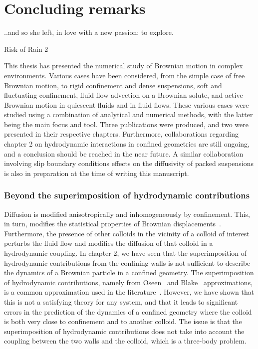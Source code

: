 \chapter{Concluding remarks}


\epigraph{..and so she left, in love with a new passion: to explore.}{Risk of Rain 2}
This thesis has presented the numerical study of Brownian motion in complex environments. Various cases have been considered, from the simple case of free Brownian motion, to rigid confinement and dense suspensions, soft and fluctuating confinement, fluid flow advection on a Brownian solute, and active Brownian motion in quiescent fluids and in fluid flows. 
These various cases were studied using a combination of analytical and numerical methods, with the latter being the main focus and tool. Three publications were produced, and two were presented in their respective chapters. Furthermore, collaborations regarding chapter 2 on hydrodynamic interactions in confined geometries are still ongoing, and a conclusion should be reached in the near future. A similar collaboration involving slip boundary conditions effects on the diffusivity of packed suspensions is also in preparation at the time of writing this manuscript.

\subsection*{Beyond the superimposition of hydrodynamic contributions}

Diffusion is modified anisotropically and inhomogeneously by confinement. This, in turn, modifies the statistical properties of Brownian displacements~\cite{millan_numerical_2023}. Furthermore, the presence of other colloids in the vicinity of a colloid of interest perturbs the fluid flow and modifies the diffusion of that colloid in a hydrodynamic coupling. In chapter 2, we have seen that the superimposition of hydrodynamic contributions from the confining walls is not sufficient to describe the dynamics of a Brownian particle in a confined geometry. The superimposition of hydrodynamic contributions, namely from Oseen~\cite{Oseen_1927} and Blake~\cite{Blake_1971} approximations, is a common approximation used in the literature~\cite{Dufresne_2000}. However, we have shown that this is not a satisfying theory for any system, and that it leads to significant errors in the prediction of the dynamics of a confined geometry where the colloid is both very close to confinement and to another colloid. The issue is that the superimposition of hydrodynamic contributions does not take into account the coupling between the two walls and the colloid, which is a three-body problem.

